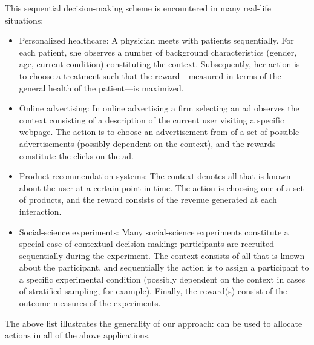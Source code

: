 \documentclass[nojss]{jss}
\begin{document}
This sequential decision-making scheme is encountered in many real-life situations:
\begin{itemize}
\item Personalized healthcare: A physician meets with patients sequentially. For each patient, she observes a number of background characteristics (gender, age, current condition) constituting the context. Subsequently, her action is to choose a treatment such that the reward---measured in terms of the general health of the patient---is maximized.
\item Online advertising: In online advertising a firm selecting an ad observes the context consisting of a description of the current user visiting a specific webpage. The action is to choose an advertisement from of a set of possible advertisements (possibly dependent on the context), and the rewards constitute the clicks on the ad.
\item Product-recommendation systems: The context denotes all that is known about the user at a certain point in time. The action is choosing one of a set of products, and the reward consists of the revenue generated at each interaction.
\item Social-science experiments: Many social-science experiments constitute a special case of contextual decision-making: participants are recruited sequentially during the experiment. The context consists of all that is known about the participant, and sequentially the action is to assign a participant to a specific experimental condition (possibly dependent on the context in cases of stratified sampling, for example). Finally, the reward(s) consist of the outcome measures of the experiments.
\end{itemize}
The above list illustrates the generality of our approach:  can be used to allocate actions in all of the above applications. 
\end{document}
